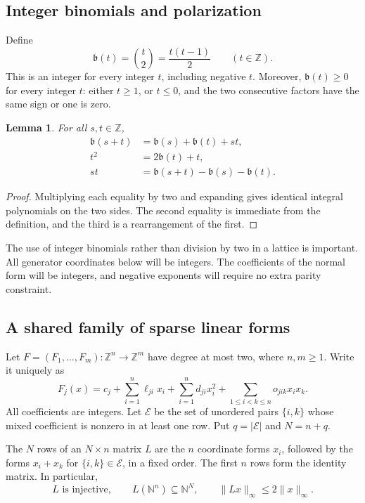 \documentclass[11pt,letterpaper]{article}
\newtheorem{lemma}[theorem]{Lemma}
\theoremstyle{definition}
\theoremstyle{remark}
\newcommand{\ZZ}{\mathbb Z}
\newcommand{\NN}{\mathbb N}
\newcommand{\bn}{\mathfrak b}
\begin{document}
\subsection{Integer binomials and polarization}
Define
\[
 \bn(t)=\binom t2=\frac{t(t-1)}2\qquad(t\in\ZZ).
\]
This is an integer for every integer $t$, including negative $t$. Moreover,
$\bn(t)\geq0$ for every integer $t$: either $t\geq1$, or $t\leq0$, and the two
consecutive factors have the same sign or one is zero.

\begin{lemma}\label{gts:tp:lem:binomial}
For all $s,t\in\ZZ$,
\begin{align}
 \bn(s+t)&=\bn(s)+\bn(t)+st,\label{gts:tp:eq:binadd}\\
 t^2&=2\bn(t)+t,\label{gts:tp:eq:square}\\
 st&=\bn(s+t)-\bn(s)-\bn(t).\label{gts:tp:eq:polar}
\end{align}
\end{lemma}
\begin{proof}
Multiplying each equality by two and expanding gives identical integral
polynomials on the two sides. The second equality is immediate from the
definition, and the third is a rearrangement of the first.
\end{proof}

The use of integer binomials rather than division by two in a lattice is
important. All generator coordinates below will be integers. The
coefficients of the normal form will be integers, and negative exponents
will require no extra parity constraint.

\subsection{A shared family of sparse linear forms}
Let $F=(F_1,\ldots,F_m):\ZZ^n\to\ZZ^m$ have degree at most two, where
$n,m\geq1$. Write it uniquely as
\begin{equation}\label{gts:tp:eq:Fcoef}
 F_j(x)=c_j+\sum_{i=1}^n\ell_{ji}x_i
       +\sum_{i=1}^n d_{ji}x_i^2
       +\sum_{1\leq i<k\leq n}o_{jik}x_ix_k.
\end{equation}
All coefficients are integers. Let $\mathcal E$ be the set of unordered
pairs $\{i,k\}$ whose mixed coefficient is nonzero in at least one row. Put
$q=|\mathcal E|$ and $N=n+q$.

The $N$ rows of an $N\times n$ matrix $L$ are the $n$ coordinate forms $x_i$,
followed by the forms $x_i+x_k$ for $\{i,k\}\in\mathcal E$, in a fixed order.
The first $n$ rows form the identity matrix. In particular,
\begin{equation}\label{gts:tp:eq:Lproperties}
 L\text{ is injective},\qquad
 L(\NN^n)\subseteq\NN^N,\qquad
 \|Lx\|_\infty\leq2\|x\|_\infty.
\end{equation}
\end{document}
